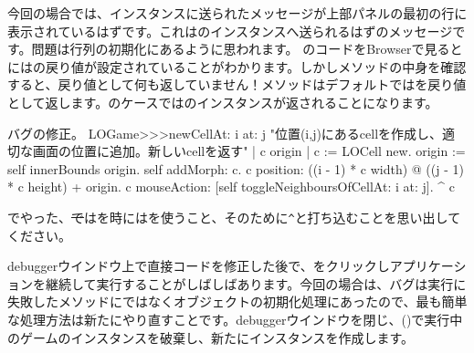 \documentclass[a4paper,10pt,twoside]{book}
\begin{document}
今回の場合では、インスタンスに送られたメッセージが上部パネルの最初の行に表示されているはずです。これはのインスタンスへ送られるはずのメッセージです。問題は行列の初期化にあるように思われます。
のコードをBrowserで見るとにはの戻り値が設定されていることがわかります。しかしメソッドの中身を確認すると、戻り値として何も返していません！メソッドはデフォルトではを戻り値として返します。のケースではのインスタンスが返されることになります。

\dothis{debuggerウインドウを閉じでください。
その後、\ct{c}を返すために``\ct{^ c}''式を \ct{LOGame>>>newCellAt:at:}メソッドの最後に追加してください。
(\mthref{newCellAt:at:nobug}参照。)}

\begin{method}{バグの修正。}
LOGame>>>newCellAt: i at: j
   "位置(i,j)にあるcellを作成し、適切な画面の位置に追加。新しいcellを返す"
   | c origin |
   c := LOCell new.
   origin := self innerBounds origin.
   self addMorph: c.
   c position: ((i - 1) * c width) @ ((j - 1) * c height) + origin.
   c mouseAction: [self toggleNeighboursOfCellAt: i at: j].
   ^ c
\end{method}

\noindent
{}でやった、\st ではを時には\ct{^}を使うこと、そのために\verb|^|と打ち込むことを思い出してください。

debuggerウインドウ上で直接コードを修正した後で、をクリックしアプリケーションを継続して実行することがしばしばあります。今回の場合は、バグは実行に失敗したメソッドにではなくオブジェクトの初期化処理にあったので、最も簡単な処理方法は新たにやり直すことです。debuggerウインドウを閉じ、()で実行中のゲームのインスタンスを破棄し、新たにインスタンスを作成します。


\end{document}
